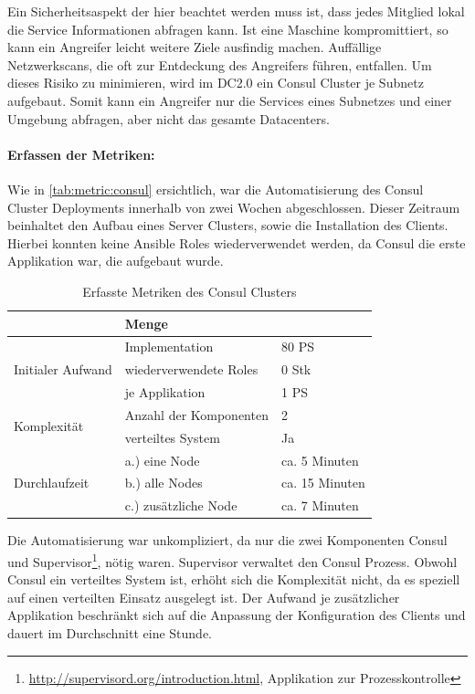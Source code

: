 Ein Sicherheitsaspekt der hier beachtet werden muss ist, dass jedes Mitglied lokal die Service Informationen abfragen kann. Ist eine Maschine kompromittiert, so kann ein Angreifer leicht weitere Ziele ausfindig machen. Auffällige Netzwerkscans, die oft zur Entdeckung des Angreifers führen, entfallen. Um dieses Risiko zu minimieren, wird im DC2.0 ein Consul Cluster je Subnetz aufgebaut. Somit kann ein Angreifer nur die Services eines Subnetzes und einer Umgebung abfragen, aber nicht das gesamte Datacenters. 

\paragraph{Erfassen der Metriken:}
Wie in \autoref{tab:metric:consul} ersichtlich, war die Automatisierung des Consul Cluster Deployments innerhalb von zwei Wochen abgeschlossen. Dieser Zeitraum beinhaltet den Aufbau eines Server Clusters, sowie die Installation des Clients. Hierbei konnten keine Ansible Roles wiederverwendet werden, da Consul die erste Applikation war, die aufgebaut wurde. 

\begin{table}[ht]
\setlength{\tabcolsep}{5pt}
\renewcommand{\arraystretch}{1.5}
\centering
\begin{tabular}{|l|l|l|}
\hline
\rowcolor[HTML]{C0C0C0}
\multicolumn{2}{|c|}{\textbf{Metrik}} & \textbf{Menge}					\\ 
\hline
\multirow{3}{*}{Initialer Aufwand}	& Implementation 		& 80 PS		\\ 
\cline{2-3}
									& wiederverwendete Roles & 0 Stk		\\
\cline{2-3}
									& je Applikation 		& 1 PS 	\\
\hline 
\multirow{2}{*}{Komplexität}			& Anzahl der Komponenten & 2 		\\
\cline{2-3}
									& verteiltes System		& Ja 		\\
\hline
\multirow{3}{*}{Durchlaufzeit} 		& a.) eine Node		& ca. 5 Minuten	\\ 
\cline{2-3} 
									& b.) alle Nodes		& ca. 15 Minuten	\\ 
\cline{2-3}							
									& c.) zusätzliche Node	& ca. 7 Minuten \\
\hline
\end{tabular} 
\caption{Erfasste Metriken des Consul Clusters}
\label{tab:metric:consul}
\end{table}

Die Automatisierung war unkompliziert, da nur die zwei Komponenten Consul und Supervisor\footnote{\url{http://supervisord.org/introduction.html}, Applikation zur Prozesskontrolle}, nötig waren. Supervisor verwaltet den Consul Prozess. Obwohl Consul ein verteiltes System ist, erhöht sich die Komplexität nicht, da es speziell auf einen verteilten Einsatz ausgelegt ist. Der Aufwand je zusätzlicher Applikation beschränkt sich auf die Anpassung der Konfiguration des Clients und dauert im Durchschnitt eine Stunde.

